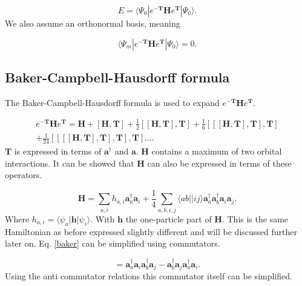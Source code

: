 \begin{equation}
E = \langle \Psi_0 |e^{-\textbf{T}} \textbf{H} e^{\textbf{T}} |\Psi_0 \rangle .
\end{equation}
We also assume an orthonormal basis, meaning

\begin{equation}
\langle \Psi_m |e^{-\textbf{T}} \textbf{H} e^{\textbf{T}} |\Psi_0 \rangle = 0 .
\end{equation}

\subsection{Baker-Campbell-Hausdorff formula}
The Baker-Campbell-Hausdorff formula is used to expand $e^{-\textbf{T}} \textbf{H} e^{\textbf{T}}$.

\begin{equation}
\begin{split}
e^{-\textbf{T}} \textbf{H} e^{\textbf{T}} = 
\textbf{H} 
+ \left[ \textbf{H}, \textbf{T} \right] 
+ \frac{1}{2} \left[ [\textbf{H}, \textbf{T}], \textbf{T} \right]  + \frac{1}{6} \left[ [ [\textbf{H}, \textbf{T}], \textbf{T}], \textbf{T} \right] \\
+ \frac{1}{24} \left[ [ [ [\textbf{H}, \textbf{T}], \textbf{T}],\textbf{T}], \textbf{T} \right] \dots .
\end{split} \label{baker}
\end{equation}
$\textbf{T}$ is expressed in terms of $\textbf{a}^{\dag}$ and $\textbf{a}$. $\textbf{H}$ contains a maximum of two orbital interactions. It can be showed that $\textbf{H}$ can also be expressed in terms of these operators. 

\begin{equation}
\textbf{H} = \sum_{a,i} h_{a,i}
\textbf{a}^{\dag}_a 
\textbf{a}_i 
+ \frac{1}{4} \sum_{a,b,i,j} \langle ab||ij \rangle
\textbf{a}^{\dag}_a  
\textbf{a}^{\dag}_b
\textbf{a}_i 
\textbf{a}_j . \label{annih}
\end{equation}
Where $h_{a,i} = \langle \psi_a | \textbf{h} | \psi_i \rangle$. With $\textbf{h}$ the one-particle part of $\textbf{H}$. This is the same Hamiltonian as before expressed slightly different and will be discussed further later on. Eq. \eqref{baker} can be simplified using commutators.

\begin{equation}
[\textbf{a}^{\dag}_a  \textbf{a}_i 
, \textbf{a}^{\dag}_b \textbf{a}_j] =
\textbf{a}^{\dag}_a  \textbf{a}_i \textbf{a}^{\dag}_b \textbf{a}_j
- \textbf{a}^{\dag}_b \textbf{a}_j \textbf{a}^{\dag}_a  \textbf{a}_i .
\end{equation} 
Using the anti commutator relations this commutator itself can be simplified.

